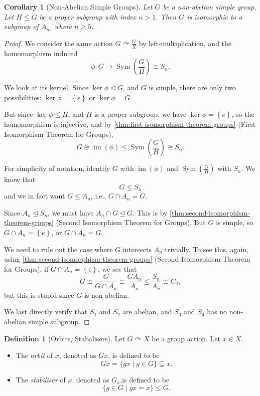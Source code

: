 \documentclass{article}
\newtheorem{corollary}[theorem]{Corollary}
\theoremstyle{definition}
\newtheorem{definition}[theorem]{Definition}
\theoremstyle{remark}
\newcommand{\pqty}[1]{\left(#1\right)}
\newcommand{\Bqty}[1]{\left\{#1\right\}}
\newcommand{\set}[2]{\{#1\mid #2\}}
\newcommand{\flatfrac}[2]{\frac{#1}{#2}}
\newcommand{\functiondomain}[3]{#1:#2\to #3}
\newcommand{\isomorphic}{\cong}
\newcommand{\normalsub}{\trianglelefteq}
\newcommand{\subgroup}{\leq}
\newcommand{\actson}{\curvearrowright}
\newcommand{\Sym}{\operatorname{Sym}}
\newcommand{\img}{\operatorname{im}}
\begin{document}
\begin{corollary}[Non-Abelian Simple Groups]
    \label{cor:non-abelian-simple-group}%
    Let \(G\) be a non-abelian simple group. Let \(H \subgroup G\) be a proper subgroup with index \(n > 1\). Then \(G\) is isomorphic to a subgroup of \(A_n\), where \(n \geq 5\).
\end{corollary}

\begin{proof}
    We consider the same action \(G \actson \flatfrac{G}{X}\) by left-multiplication, and the homomorphism induced
    \[
        \functiondomain{\phi}{G}{\Sym\pqty{\flatfrac{G}{H}} \isomorphic S_n}.
    \]

    We look at its kernel. Since \(\ker \phi \normalsub G\), and \(G\) is simple, there are only two possibilities: \(\ker \phi = \Bqty{e}\) or \(\ker \phi = G\).

    But since \(\ker \phi \subgroup H\), and \(H\) is a proper subgroup, we have \(\ker \phi = \Bqty{e}\), so the homomorphism is injective, and by \autoref{thm:first-isomorphism-theorem-groups} (First Isomorphism Theorem for Groups),
    \[
        G \isomorphic \img \pqty{\phi} \subgroup \Sym\pqty{\flatfrac{G}{H}} \isomorphic S_n.
    \]

    For simplicity of notation, identify \(G\) with \(\img \pqty{\phi}\) and \(\Sym\pqty{\flatfrac{G}{H}}\) with \(S_n\). We know that
    \[
        G \subgroup S_n
    \]
    and we in fact want \(G \subgroup A_n\), i.e., \(G \cap A_n = G\).

    Since \(A_n \normalsub S_n\), we must have \(A_n \cap G \normalsub G\). This is by \autoref{thm:second-isomorphism-theorem-groups} (Second Isomorphism Theorem for Groups). But \(G\) is simple, so \(G \cap A_n = \Bqty{e}\), or \(G \cap A_n = G\).

    We need to rule out the case where \(G\) intersects \(A_n\) trivially. To see this, again, using \autoref{thm:second-isomorphism-theorem-groups} (Second Isomorphism Theorem for Groups), if \(G \cap A_n = \Bqty{e}\), we see that
    \[
        G \isomorphic \flatfrac{G}{G \cap A_n} \isomorphic \flatfrac{G A_n}{A_n} \leq \flatfrac{S_n}{A_n} \isomorphic C_2,
    \]
    but this is stupid since \(G\) is non-abelian.

    We last directly verify that \(S_1\) and \(S_2\) are abelian, and \(S_3\) and \(S_4\) has no non-abelian simple subgroup.
\end{proof}

\begin{definition}[Orbits, Stabalisers]
    \label{def:orbits-stablisers}%
    Let \(G \actson X\) be a group action. Let \(x \in X\).
    
    \begin{itemize}
        \item The \emph{orbit} of \(x\), denoted as \(G x\), is defined to be
        \[
            G x = \set{gx}{g \in G} \subseteq x.
        \]
        \item The \emph{stabiliser}  of \(x\), denoted as \(G_x\),is defined to be
        \[
            \set{g \in G}{gx = x} \subgroup G.
        \]
    \end{itemize}
\end{definition}
\end{document}
